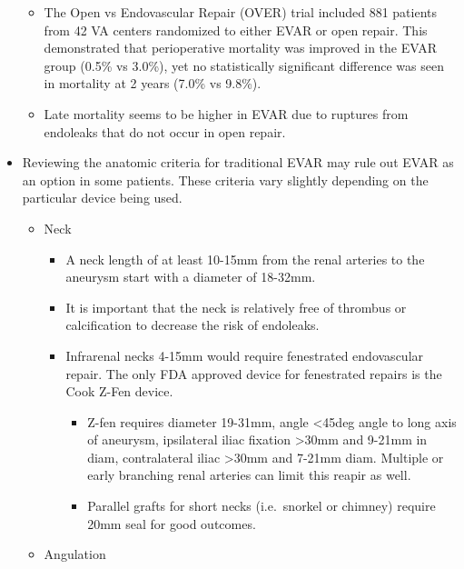 \documentclass[
]{book}
\begin{document}
\begin{itemize}
  \begin{itemize}
  \item
    The Open vs Endovascular Repair (OVER) trial included 881
    patients from 42 VA centers randomized to either EVAR or open
    repair. This demonstrated that perioperative mortality was
    improved in the EVAR group (0.5\% vs 3.0\%), yet no statistically
    significant difference was seen in mortality at 2 years (7.0\% vs
    9.8\%). \citep{lederleOpenEndovascularRepair2019}
  \item
    Late mortality seems to be higher in EVAR due to ruptures from
    endoleaks that do not occur in open repair.
    \citep{rajendranLateRuptureAbdominal2017}
  \end{itemize}
\item
  Reviewing the anatomic criteria for traditional EVAR may rule out
  EVAR as an option in some patients. These criteria vary slightly
  depending on the particular device being used.

  \begin{itemize}
  \item
    Neck

    \begin{itemize}
    \item
      A neck length of at least 10-15mm from the renal arteries to
      the aneurysm start with a diameter of 18-32mm.
    \item
      It is important that the neck is relatively free of thrombus
      or calcification to decrease the risk of endoleaks.
    \item
      Infrarenal necks 4-15mm would require fenestrated
      endovascular repair. The only FDA approved device for
      fenestrated repairs is the Cook Z-Fen
      device.\citep{oderichResultsUnitedStates2014}

      \begin{itemize}
      \item
        Z-fen requires diameter 19-31mm, angle \textless45deg angle to
        long axis of aneurysm, ipsilateral iliac fixation \textgreater30mm
        and 9-21mm in diam, contralateral iliac \textgreater30mm and
        7-21mm diam. Multiple or early branching renal arteries
        can limit this reapir as well.
        \citep{oderichTechnicalAspectsRepair2014}
      \item
        Parallel grafts for short necks (i.e.~snorkel or
        chimney) require 20mm seal for good outcomes.
        \citep{donasCollectedWorldExperience2015}
      \end{itemize}
    \end{itemize}
  \item
    Angulation


\end{itemize}
\end{itemize}
\end{document}
